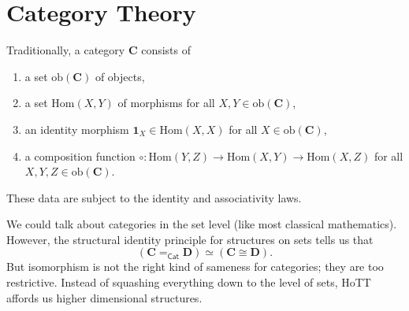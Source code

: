 \documentclass{amsart}
\theoremstyle{definition}
\newcommand{\Cat}{\ensuremath{\mathsf{Cat}}}
\newcommand{\ob}[1]{\ensuremath{\mathrm{ob}{(\cat{#1})}}}
\newcommand{\cHom}[2]{\ensuremath{\mathrm{Hom}(#1,#2)}}
\newcommand{\cId}{\ensuremath{\mathbf{1}}}
\newcommand{\cat}[1]{\ensuremath{\mathbf{#1}}}
\begin{document}
\section{Category Theory}

Traditionally, a category $\cat{C}$ consists of
\begin{enumerate}
    \item a set $\ob{C}$ of objects,
    \item a set $\cHom{X}{Y}$ of morphisms for all $X, Y \in \ob{C}$,
    \item an identity morphism $\cId_{X} \in \cHom{X}{X}$ for all $X \in \ob{C}$,
    \item a composition function $\circ : \cHom{Y}{Z} \to \cHom{X}{Y} \to \cHom{X}{Z}$ for all $X, Y, Z \in \ob{C}$.
\end{enumerate}
These data are subject to the identity and associativity laws.

We could talk about categories in the set level (like most classical mathematics).
However, the structural identity principle for structures on sets tells us that 
\[(\cat{C} =_{\Cat} \cat{D}) \simeq (\cat{C} \cong \cat{D}).\]
But isomorphism is not the right kind of sameness for categories; they are too restrictive.
Instead of squashing everything down to the level of sets, HoTT affords us higher dimensional structures.
\end{document}
